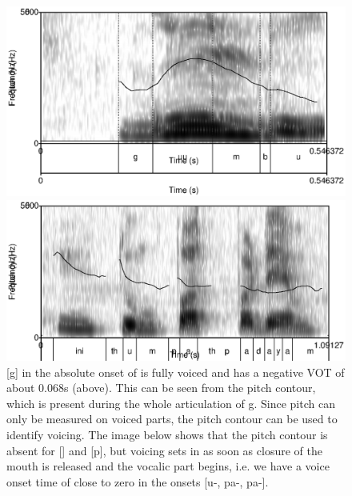 \begin{figure}
 \centering
 \includegraphics[height=0.3\textheight]{./pics/guumbu-a.eps}

 \includegraphics[height=0.3\textheight]{./pics/inithumpathpadayam.eps}

 \caption[VOT of /g,\dentt, p/ in onsets]{[g] in the absolute onset of  is fully voiced and has a negative VOT of about 0.068s (above). This can be seen from the pitch contour, which is present during the whole articulation of g. Since pitch can only be measured on voiced parts, the pitch contour can be used to identify voicing. The image below shows that the pitch contour is absent for  [\dentt] and [p], but voicing sets in as soon as closure of the mouth is released and the vocalic part begins, i.e. we  have a voice onset time of close to zero in the onsets [\dentt u-, pa-, pa-].}
 \label{fig:phon:vot:inithumpathpadayam}
\end{figure}

